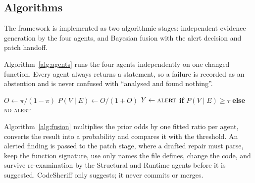 \documentclass[conference]{IEEEtran}
\begin{document}
\subsection{Algorithms}

The framework is implemented as two algorithmic stages: independent
evidence generation by the four agents, and Bayesian fusion with the alert
decision and patch handoff.

\begin{algorithm}[htbp]
\small
\caption{Agent Evidence Generation}
\label{alg:agents}
\;
\end{algorithm}

Algorithm~\ref{alg:agents} runs the four agents independently on one changed
function. Every agent always returns a statement, so a failure is recorded
as an abstention and is never confused with ``analysed and found nothing''.

\begin{algorithm}[htbp]
\small
\caption{Bayesian Fusion, Decision and Patching}
\label{alg:fusion}
$O \gets \pi/(1-\pi)$\;
$P(V\mid E) \gets O/(1+O)$\;
$Y \gets \textsc{alert}$ \textbf{if} $P(V\mid E)\ge\tau$ \textbf{else} \textsc{no alert}\;
\;
\end{algorithm}

Algorithm~\ref{alg:fusion} multiplies the prior odds by one fitted ratio per
agent, converts the result into a probability and compares it with the
threshold. An alerted finding is passed to the patch stage, where a drafted
repair must parse, keep the function signature, use only names the file
defines, change the code, and survive re-examination by the Structural and
Runtime agents before it is suggested. CodeSheriff only suggests; it never
commits or merges.
\end{document}
